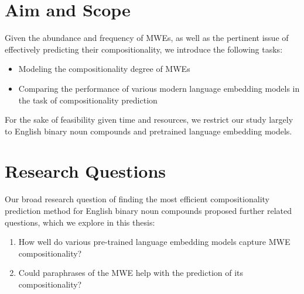 \section{Aim and Scope}
Given the abundance and frequency of MWEs, as well as the pertinent issue of effectively predicting their compositionality, we introduce the following tasks:
\begin{itemize}
    \item Modeling the compositionality degree of MWEs
    \item Comparing the performance of various modern language embedding models in the task of compositionality prediction
\end{itemize}
For the sake of feasibility given time and resources, we restrict our study largely to English binary noun compounds and pretrained language embedding models.

\section{Research Questions}
Our broad research question of finding the most efficient compositionality prediction method for English binary noun compounds proposed further related questions, which we explore in this thesis:
\begin{enumerate}
    \item How well do various pre-trained language embedding models capture MWE compositionality?
    \item Could paraphrases of the MWE help with the prediction of its compositionality?
\end{enumerate}

